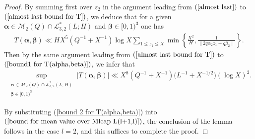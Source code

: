 \documentclass{amsart}%
\numberwithin{equation}{section}
\theoremstyle{remark}
\newcommand{\R}{\mathbb{R}}
\newcommand{\1}{\mathbbm{1}}
\begin{document}
\begin{proof}
 By summing first over $z_2$ in the argument leading from $(\ref{almost last})$ to $(\ref{almost last bound for T})$, we deduce that for a given $\boldsymbol{\alpha}\in \mathcal{M}_2(Q)\cap \mathcal{L}^*_{3,2}(L;H)$ and $\boldsymbol{\beta}\in [0,1)^3$ one has
 \begin{equation*}
 \begin{aligned}
T(\boldsymbol{\alpha},\boldsymbol{\beta})\ll HX^{5}\left(Q^{-1}+X^{-1}\right)\log X\sum_{1\leq z_1\leq X}\min\left\{\frac{X^{2}}{H},\frac{1}{\|2q\alpha_2z_1+q\beta_2\|}\right\}.
 \end{aligned}
 \end{equation*}
Then by the same argument leading from $(\ref{almost last bound for T})$ to $(\ref{bound1 for T(alpha,beta)})$, we infer that
\begin{equation}\label{bound 2 for T(alpha,beta)}
\begin{aligned}
\sup_{\substack{\boldsymbol{\alpha}\in \mathcal{M}_2(Q)\cap \mathcal{L}^*_{3,2}(L;H)\\ \boldsymbol{\beta}\in [0,1)^3 }} |T(\boldsymbol{\alpha},\boldsymbol{\beta})|\ll X^{8}\left(Q^{-1}+X^{-1}\right)\bigl(L^{-1}+{X^{-1/2}}\bigr)(\log X)^2.
\end{aligned}
\end{equation}

By substituting (\ref{bound 2 for T(alpha,beta)}) into $(\ref{bound for mean value over Mlcap L(l+1,l)})$, the conclusion of the lemma follows in the case $l=2$, and this suffices to complete the proof.
\end{proof}

\end{document}
